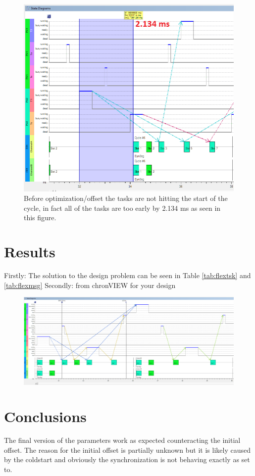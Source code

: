 \begin{figure}[h!]
	\begin{center}
		\includegraphics[width=0.9\linewidth]{img/FR-offset}
		\caption{Before optimization/offset the tasks are not hitting the start of the cycle, in fact all of the tasks are too early by 2.134 ms as seen in this figure.}
		\label{fig:FRoffset}
	\end{center}
\end{figure}



\section{Results}

Firstly: The solution to the design problem can be seen in Table \ref{tab:flextsk} and \ref{tab:flexmsg}
Secondly: from chronVIEW for your design



\begin{figure}[h!]
	\begin{center}
		\includegraphics[width=0.9\linewidth]{img/FR-state-Diagram}
		\caption{}
		\label{fig:FRdiagram}
	\end{center}
\end{figure}

\section{Conclusions}

The final version of the parameters work as expected counteracting the initial offset. The reason for the initial offset is partially unknown but it is likely caused by the coldstart and obviously the synchronization is not behaving exactly as set to.